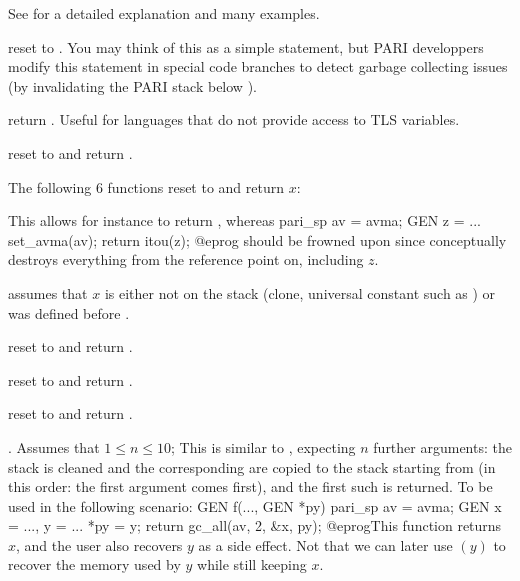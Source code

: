 See  for a detailed explanation and many examples.

 reset  to . You may think
of this as a simple  statement, but PARI developpers modify
this statement in special code branches to detect garbage collecting
issues (by invalidating the PARI stack below ).

 return . Useful for languages that
do not provide access to TLS variables.

 reset  to  and return
.

The following 6 functions reset  to  and return $x$:





 This allows for instance
to return , whereas
\bprog
  pari_sp av = avma;
  GEN z = ...
  set_avma(av);
  return itou(z);
@eprog should be frowned upon since  conceptually
destroys everything from the reference point on, including $z$.

 assumes that $x$ is either not on the
stack (clone, universal constant such as ) or was defined
before .

 reset  to  and return
.

 reset  to  and return
.

 reset  to  and return
.

. Assumes that $1 \leq n \leq
10$; This is similar to , expecting $n$ further 
arguments: the stack is cleaned and the corresponding  are
copied to the stack starting from  (in this order: the first argument
comes first), and the first such  is returned. To be used in the
following scenario:
\bprog
  GEN f(..., GEN *py)
  {
    pari_sp av = avma;
    GEN x = ..., y = ...
    *py = y; return gc_all(av, 2, &x, py);
  }
@eprog\noindent This function returns $x$, and the user also recovers $y$
as a side effect. Not that we can later use $(y)$ to recover the
memory used by $y$ while still keeping $x$.

